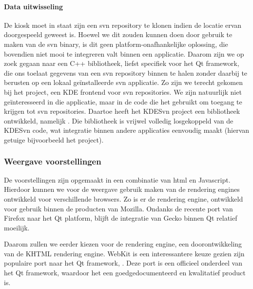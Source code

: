 \paragraph{Data uitwisseling} De kiosk moet in staat zijn een \ac{svn} repository te klonen indien de locatie ervan doorgespeeld geweest is. Hoewel we dit zouden kunnen doen door gebruik te maken van de \ac{svn} binary, is dit geen platform-onafhankelijke oplossing, die bovendien niet mooi te integreren valt binnen een applicatie. Daarom zijn we op zoek gegaan naar een C++ bibliotheek, liefst specifiek voor het Qt framework, die ons toelaat gegevens van een \ac{svn} repository binnen te halen zonder daarbij te berusten op een lokaal geïnstalleerde \ac{svn} applicatie. Zo zijn we terecht gekomen bij het  project, een KDE frontend voor \ac{svn} repositories. We zijn natuurlijk niet geïnteresseerd in die applicatie, maar in de code die het gebruikt om toegang te krijgen tot \ac{svn} repositories. Daartoe heeft het KDESvn project een bibliotheek ontwikkeld, namelijk . Die bibliotheek is vrijwel volledig losgekoppeld van de KDESvn code, wat integratie binnen andere applicaties eenvoudig maakt (hiervan getuige bijvoorbeeld het  project).

\subsubsection{Weergave voorstellingen}

De voorstellingen zijn opgemaakt in een combinatie van \ac{html} en Javascript. Hierdoor kunnen we voor de weergave gebruik maken van de rendering engines ontwikkeld voor verschillende browsers. Zo is er de  rendering engine, ontwikkeld voor gebruik binnen de producten van Mozilla. Ondanks de recente port van Firefox naar het Qt platform, blijft de integratie van Gecko binnen Qt relatief moeilijk.

Daarom zullen we eerder kiezen voor de  rendering engine, een doorontwikkeling van de KHTML rendering engine. WebKit is een interessantere keuze gezien zijn populaire port naar het Qt framework, . Deze port is een officieel onderdeel van het Qt framework, waardoor het een goedgedocumenteerd en kwalitatief product is.

